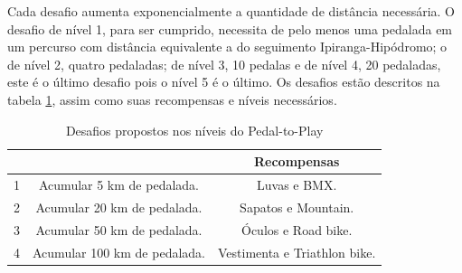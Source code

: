 Cada desafio aumenta exponencialmente a quantidade de distância necessária. O desafio de nível 1, para ser cumprido, necessita de pelo menos uma pedalada em um percurso com distância equivalente a do seguimento Ipiranga-Hipódromo; o de nível 2, quatro pedaladas; de nível 3, 10 pedalas e de nível 4, 20 pedaladas, este é o último desafio pois o nível 5 é o último. Os desafios estão descritos na tabela \ref{tab:quests}, assim como suas recompensas e níveis necessários.

\begin{table}
\centering
\caption{Desafios propostos nos níveis do Pedal-to-Play}
\label{my-label}
\begin{tabular}{ccc}
\rowcolor[HTML]{C0C0C0} 
\multicolumn{1}{c|}{\cellcolor[HTML]{C0C0C0}{\color[HTML]{FFFFFF} \textbf{Nível}}} & \multicolumn{1}{c|}{\cellcolor[HTML]{C0C0C0}{\color[HTML]{FFFFFF} \textbf{Requisitos do Desafio}}} & {\color[HTML]{FFFFFF} \textbf{Recompensas}} \\ \hline
\multicolumn{1}{c|}{1}                                                             & \multicolumn{1}{c|}{Acumular 5 km de pedalada.}                                                    & Luvas e BMX.                                 \\ \hline
\multicolumn{1}{c|}{2}                                                             & \multicolumn{1}{c|}{Acumular 20 km de pedalada.}                                                   & Sapatos e Mountain.                       \\ \hline
\multicolumn{1}{c|}{3}                                                            & \multicolumn{1}{c|}{Acumular 50 km de pedalada.}                                                   & Óculos e Road bike.                           \\ \hline
\multicolumn{1}{c|}{4}                                                             & \multicolumn{1}{c|}{Acumular 100 km de pedalada.}                                                  & Vestimenta e Triathlon bike.                 \\ \hline
\end{tabular}
\label{tab:quests}
\end{table}

